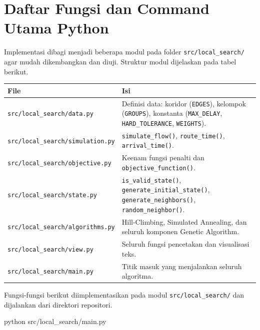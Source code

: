 \documentclass[11pt,a4paper]{article}
\begin{document}
\section{Daftar Fungsi dan Command Utama Python}

Implementasi dibagi menjadi beberapa modul pada folder \texttt{src/local\_search/} agar mudah dikembangkan dan diuji. Struktur modul dijelaskan pada tabel berikut.

\begin{tabularx}{\textwidth}{|l|>{\raggedright\arraybackslash}X|}
\hline
\textbf{File} & \textbf{Isi} \\
\hline
\texttt{src/local\_search/data.py} & Definisi data: koridor (\texttt{EDGES}), kelompok (\texttt{GROUPS}), konstanta (\texttt{MAX\_DELAY}, \texttt{HARD\_TOLERANCE}, \texttt{WEIGHTS}). \\
\hline
\texttt{src/local\_search/simulation.py} & \texttt{simulate\_flow()}, \texttt{route\_time()}, \texttt{arrival\_time()}. \\
\hline
\texttt{src/local\_search/objective.py} & Keenam fungsi penalti dan \texttt{objective\_function()}. \\
\hline
\texttt{src/local\_search/state.py} & \texttt{is\_valid\_state()}, \texttt{generate\_initial\_state()}, \texttt{generate\_neighbors()}, \texttt{random\_neighbor()}. \\
\hline
\texttt{src/local\_search/algorithms.py} & Hill-Climbing, Simulated Annealing, dan seluruh komponen Genetic Algorithm. \\
\hline
\texttt{src/local\_search/view.py} & Seluruh fungsi pencetakan dan visualisasi teks. \\
\hline
\texttt{src/local\_search/main.py} & Titik masuk yang menjalankan seluruh algoritma. \\
\hline
\end{tabularx}

Fungsi-fungsi berikut diimplementasikan pada modul \texttt{src/local\_search/} dan dijalankan dari direktori repositori.

\begin{pycode}
python src/local_search/main.py
\end{pycode}
\end{document}
